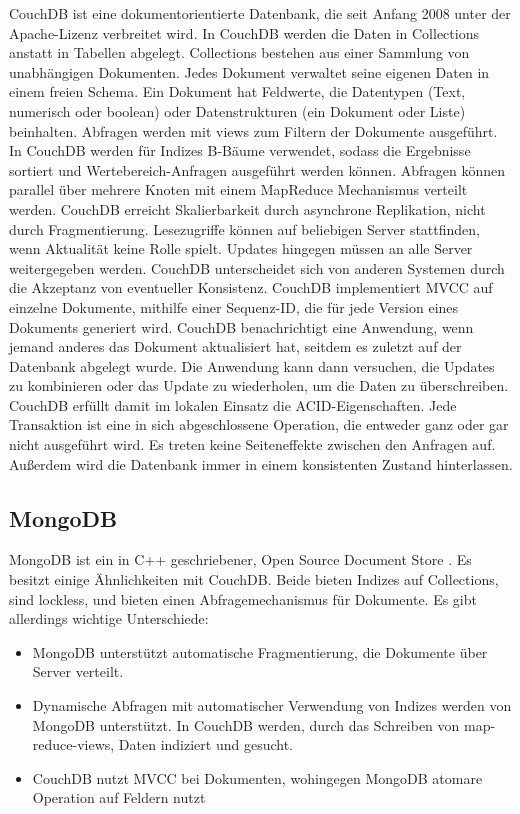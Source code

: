 CouchDB \cite{couch2013} ist eine dokumentorientierte Datenbank, die seit Anfang 2008 unter der  Apache-Lizenz verbreitet wird. In CouchDB werden die Daten in Collections anstatt in Tabellen abgelegt. Collections bestehen aus einer Sammlung von unabhängigen Dokumenten. Jedes Dokument verwaltet seine eigenen Daten in einem freien Schema. 
Ein Dokument hat Feldwerte, die Datentypen (Text, numerisch oder boolean) oder Datenstrukturen (ein Dokument oder Liste) beinhalten. Abfragen werden mit views zum Filtern der Dokumente ausgeführt. In CouchDB werden für Indizes B-Bäume verwendet, sodass die Ergebnisse sortiert und Wertebereich-Anfragen ausgeführt werden können. Abfragen können parallel über mehrere Knoten mit einem MapReduce Mechanismus verteilt werden. CouchDB erreicht Skalierbarkeit durch asynchrone Replikation, nicht durch Fragmentierung. Lesezugriffe können auf beliebigen Server stattfinden, wenn Aktualität keine Rolle spielt. Updates hingegen müssen an alle Server weitergegeben werden.
CouchDB unterscheidet sich von anderen Systemen durch die Akzeptanz von eventueller Konsistenz. CouchDB implementiert MVCC auf einzelne Dokumente, mithilfe einer Sequenz-ID, die für jede Version eines Dokuments generiert wird. CouchDB benachrichtigt eine Anwendung, wenn jemand anderes das Dokument aktualisiert hat, seitdem es zuletzt auf der Datenbank abgelegt wurde. Die Anwendung kann dann versuchen, die Updates zu kombinieren oder das Update zu wiederholen, um die Daten zu überschreiben. CouchDB erfüllt damit im lokalen Einsatz die ACID-Eigenschaften. Jede Transaktion ist eine in sich abgeschlossene Operation, die entweder ganz oder gar nicht ausgeführt wird. Es treten keine Seiteneffekte zwischen den Anfragen auf. Außerdem wird die Datenbank immer in einem konsistenten Zustand hinterlassen.

\subsection{MongoDB}
\label{ch:AnalyseDatenbanken:sec:Datenbanken:subsec:MongoDB}

MongoDB ist ein in C++ geschriebener, Open Source Document Store \cite{books/daglib/0025185}. Es besitzt einige Ähnlichkeiten mit CouchDB. Beide bieten Indizes auf Collections, sind lockless, und bieten einen Abfragemechanismus für Dokumente. Es gibt allerdings wichtige Unterschiede:

\begin{itemize}

	\item MongoDB unterstützt automatische Fragmentierung, die Dokumente über Server verteilt.
	\item Dynamische Abfragen mit automatischer Verwendung von Indizes werden von MongoDB unterstützt. In CouchDB werden, durch das Schreiben von map-reduce-views, Daten indiziert und gesucht.
	\item CouchDB nutzt MVCC bei Dokumenten, wohingegen MongoDB atomare Operation auf Feldern nutzt   

\end{itemize}

